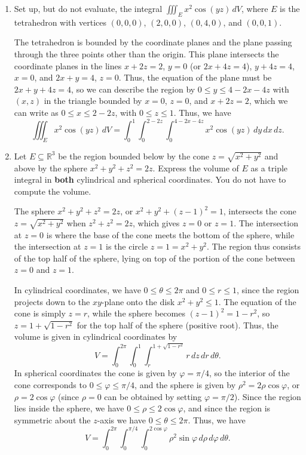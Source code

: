 \documentclass[12pt]{article}
\newcommand{\points}[1]{\marginpar{\hspace{24pt}[#1]}}
\newcommand{\di}{\displaystyle}
\newcommand{\R}{\mathbb{R}}
\begin{document}
\begin{enumerate}
\item Set up, but do not evaluate, the integral $\di \iiint_E x^2\cos(yz)\,dV$, where $E$ is the tetrahedron with vertices $(0,0,0)$, $(2,0,0)$, $(0,4,0)$, and $(0,0,1)$. \points{6}

\bigskip

The tetrahedron is bounded by the coordinate planes and the plane passing through the three points other than the origin. This plane intersects the coordinate planes in the lines $x+2z=2$, $y=0$ (or $2x+4z=4$), $y+4z=4$, $x=0$, and $2x+y=4$, $z=0$. Thus, the equation of the plane must be $2x+y+4z=4$, so we can describe the region by $0\leq y\leq 4-2x-4z$ with $(x,z)$ in the triangle bounded by $x=0$, $z=0$, and $x+2z=2$, which we can write as $0\leq x\leq 2-2z$, with $0\leq z\leq 1$. Thus, we have
\[
 \iiint_E x^2\cos(yz)\,dV = \int_0^1\int_{0}^{2-2z}\int_0^{4-2x-4z}x^2\cos(yz)\,dy\,dx\,dz.
\]

\bigskip

\bigskip


\item Let $E\subseteq \R^3$ be the region bounded below by the cone $z=\sqrt{x^2+y^2}$ and above by the sphere $x^2+y^2+z^2=2z$. Express the volume of $E$ as a triple integral in {\bf both} cylindrical and spherical coordinates. You do not have to compute the volume. \points{6}


\bigskip

The sphere $x^2+y^2+z^2=2z$, or $x^2+y^2+(z-1)^2=1$, intersects the cone $z=\sqrt{x^2+y^2}$ when $z^2+z^2=2z$, which gives $z=0$ or $z=1$. The intersection at $z=0$ is where the base of the cone meets the bottom of the sphere, while the intersection at $z=1$ is the circle $z=1=x^2+y^2$. The region thus consists of the top half of the sphere, lying on top of the portion of the cone between $z=0$ and $z=1$.

In cylindrical coordinates, we have $0\leq \theta\leq 2\pi$ and $0\leq r\leq 1$, since the region projects down to the $xy$-plane onto the disk $x^2+y^2\leq 1$. The equation of the cone is simply $z=r$, while the sphere becomes $(z-1)^2 = 1-r^2$, so $z=1+\sqrt{1-r^2}$ for the top half of the sphere (positive root). Thus, the volume is given in cylindrical coordinates by
\[
 V = \int_0^{2\pi}\int_0^1\int_r^{1+\sqrt{1-r^2}}r\,dz\,dr\,d\theta.
\]
In spherical coordinates the cone is given by $\varphi = \pi/4$, so the interior of the cone corresponds to $0\leq\varphi\leq \pi/4$, and the sphere is given by $\rho^2=2\rho\cos\varphi$, or $\rho=2\cos\varphi$ (since $\rho=0$ can be obtained by setting $\varphi = \pi/2$). Since the region lies inside the sphere, we have $0\leq \rho\leq 2\cos\varphi$, and since the region is symmetric about the $z$-axis we have $0\leq \theta\leq 2\pi$. Thus, we have
\[
 V = \int_0^{2\pi}\int_0^{\pi/4}\int_0^{2\cos\varphi}\rho^2\sin\varphi\,d\rho\,d\varphi\,d\theta.
\]

\end{enumerate}
\end{document}

